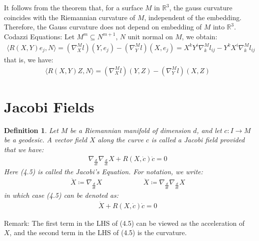 \documentclass[11pt]{book}
\theoremstyle{break}
\theoremstyle{break}
\newtheorem{defn}{Definition}[corL]
\newcommand{\R}{\mathbb{R}}
\newcommand{\remark}{\color{blue}Remark: \color{black}}
\begin{document}
It follows from the theorem that, for a surface $M$ in $\R^3$, the gauss curvature coincides with the Riemannian curvature of $M$, independent of the embedding. Therefore, the  Gauss curvature does not depend on embedding of $M$ into $\R^3$. \\

Codazzi Equations:
Let $M^m \subseteq N^{m+1}$, $N$ unit normal on $M$, we obtain:
\begin{align*}
\langle R(X,Y)e_j,N\rangle = (\nabla_X^Ml)(Y,e_j) - (\nabla_Y^Ml)(X,e_j) = X^kY^i\nabla^M_kl_{ij}-Y^kX^i\nabla_k^Ml_{ij}
\end{align*}
that is, we have:
\begin{align*}
\langle R(X,Y)Z,N\rangle = (\nabla_X^M l)(Y,Z) - (\nabla_Y^Ml)(X,Z)
\end{align*}
 
\newpage
\section[Jacobi Fields]{\color{red}Jacobi Fields \color{black}}
\begin{defn}
Let $M$ be a Riemannian manifold of dimension $d$, and let $c:I \to M$ be a geodesic. A vector field $X$ along the curve $c$ is called a Jacobi field provided that we have:
\begin{align}
\nabla_{\frac{d}{dt}}\nabla_{\frac{d}{dt}}X + R(X,\dot{c})\dot{c} = 0
\end{align}
Here (4.5) is called the Jacobi's Equation. For notation, we write:
\begin{align*}
\dot{X} \coloneqq \nabla_{\frac{d}{dt}}X\qquad\qquad\qquad \ddot{X} \coloneqq \nabla_{\frac{d}{dt}}\nabla_{\frac{d}{dt}}X
\end{align*}
in which case (4.5) can be denoted as:
\begin{align*}
\ddot{X} + R(X,\dot{c})\dot{c} = 0
\end{align*}
\end{defn}

\remark The first term in the LHS of (4.5) can be viewed as the acceleration of $X$, and the second term in the LHS of (4.5) is the curvature. \\
\end{document}
